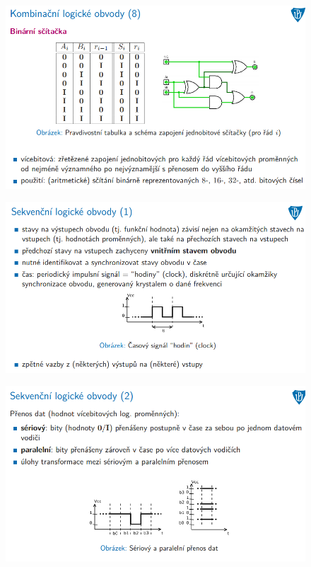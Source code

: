 \documentclass[10pt,a4paper]{article}
\begin{document}
\begin{figure} [h]
	\includegraphics[scale=0.65]{img/prvni_odstavec/otazka2/kombinacni_logicke_obvody8.png}	
\end{figure}

\begin{figure} [h]
	\includegraphics[scale=0.65]{img/prvni_odstavec/otazka2/sekvencni_logicke_obvody1.png}	
\end{figure}

\begin{figure} [h]
	\includegraphics[scale=0.65]{img/prvni_odstavec/otazka2/sekvencni_logicke_obvody2.png}	
\end{figure}
\end{document}
